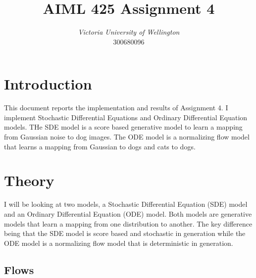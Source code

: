 \documentclass[conference,a4paper]{IEEEtran}
\begin{document}
\title{AIML 425 Assignment 4 %
}

\author{
\textit{Victoria University of Wellington}\\
300680096}


\maketitle

\section{Introduction}

This document reports the implementation and results of Assignment 4. I implement Stochastic Differential Equations and Ordinary Differential Equation models. THe SDE model is a score based generative model to learn a mapping from Gaussian noise to dog images. The ODE model is a normalizing flow model that learns a mapping from Gaussian to dogs and cats to dogs.

\section{Theory}

I will be looking at two models, a Stochastic Differential Equation (SDE) model and an Ordinary Differential Equation (ODE) model. Both models are generative models that learn a mapping from one distribution to another. The key difference being that the SDE model is score based and stochastic in generation while the ODE model is a normalizing flow model that is deterministic in generation.

\subsection{Flows}
\end{document}
